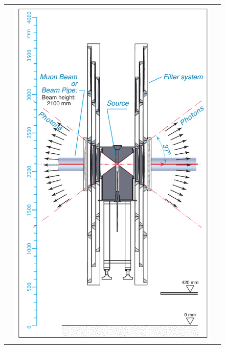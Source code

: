 \begin{figure}[htp]
\begin{tabular}{ccc}
& \hspace{-0.632cm} \includegraphics[scale=0.443]{fig/wincc/filters.pdf}

\end{tabular}
\end{figure}
